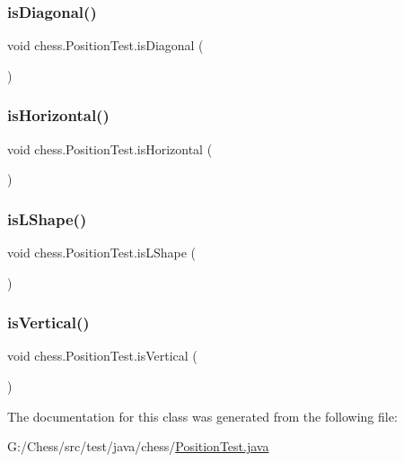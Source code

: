 \subsubsection{\texorpdfstring{is\+Diagonal()}{isDiagonal()}}
{\footnotesize\ttfamily void chess.\+Position\+Test.\+is\+Diagonal (\begin{DoxyParamCaption}{ }\end{DoxyParamCaption})}

\mbox{\label{classchess_1_1_position_test_aad10037e6fd3a768d9f62f6959df38d2}} 
\subsubsection{\texorpdfstring{is\+Horizontal()}{isHorizontal()}}
{\footnotesize\ttfamily void chess.\+Position\+Test.\+is\+Horizontal (\begin{DoxyParamCaption}{ }\end{DoxyParamCaption})}

\mbox{\label{classchess_1_1_position_test_ad89a0615d380a654fe92366058f90e56}} 
\subsubsection{\texorpdfstring{is\+L\+Shape()}{isLShape()}}
{\footnotesize\ttfamily void chess.\+Position\+Test.\+is\+L\+Shape (\begin{DoxyParamCaption}{ }\end{DoxyParamCaption})}

\mbox{\label{classchess_1_1_position_test_af2a08be80ec38fa515c2fa0308184b40}} 
\subsubsection{\texorpdfstring{is\+Vertical()}{isVertical()}}
{\footnotesize\ttfamily void chess.\+Position\+Test.\+is\+Vertical (\begin{DoxyParamCaption}{ }\end{DoxyParamCaption})}



The documentation for this class was generated from the following file\+:\begin{DoxyCompactItemize}
\item 
G\+:/\+Chess/src/test/java/chess/\mbox{\hyperlink{_position_test_8java}{Position\+Test.\+java}}\end{DoxyCompactItemize}

